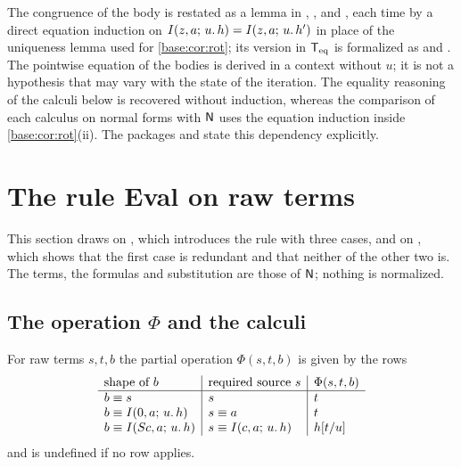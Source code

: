 \begin{remark}
The congruence of the body is restated as a lemma in ,
,  and
, each time by a direct equation induction on
$I(z,a;\,u.\,h)=I(z,a;\,u.\,h')$ in place of the uniqueness lemma used
for \cref{base:cor:rot}; its version in $\mathsf{T}_{\mathrm{eq}}$ is formalized as
 and . The pointwise equation
of the bodies is derived in a context without $u$; it is not a hypothesis
that may vary with the state of the iteration. The equality reasoning of
the calculi below is recovered without induction, whereas the comparison of
each calculus on normal forms with $\mathsf{N}$ uses the equation induction
inside \cref{base:cor:rot}(ii). The packages  and
 state this dependency explicitly.
\end{remark}

\section{The rule Eval on raw terms}
\label{comp:sec:eval}

This section draws on , which introduces the
rule  with three cases, and on
, which shows that the first case is
redundant and that neither of the other two is. The terms, the formulas and
substitution are those of $\mathsf{N}$; nothing is normalized.

\subsection{The operation \texorpdfstring{$\Phi$}{Phi} and the calculi}

\begin{definition}
\label{comp:def:phi}
For raw terms $s,t,b$ the partial operation $\Phi(s,t,b)$ is given by the
rows
\[
\begin{array}{l|l|l}
 \text{shape of }b & \text{required source }s & \Phi(s,t,b)\\ \hline
 b\equiv s & s & t\\
 b\equiv I(0,a;\,u.\,h) & s\equiv a & t\\
 b\equiv I(S c,a;\,u.\,h) & s\equiv I(c,a;\,u.\,h) & h[t/u]
\end{array}
\]
and is undefined if no row applies.
\end{definition}

